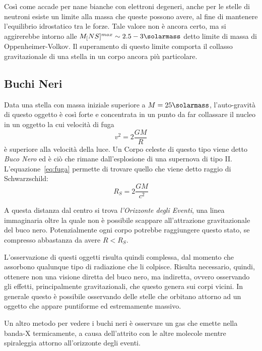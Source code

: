 Così come accade per nane bianche con elettroni degeneri, anche per le stelle di neutroni esiste un limite alla massa che queste possono avere, al fine di mantenere l'equilibrio idrostatico tra le forze. Tale valore non è ancora certo, ma si aggirerebbe intorno alle $M_[NS]^{max} \sim 2.5 - 3 \si{\solarmass}$ detto limite di massa di Oppenheimer-Volkov. Il superamento di questo limite comporta il collasso gravitazionale di una stella in un corpo ancora più particolare.\subsection{Buchi Neri}\label{black-holes}

Data una stella con massa iniziale superiore a $M = 25\si{\solarmass}$, l'auto-gravità di questo oggetto è così forte e concentrata in un punto da far collassare il nucleo in un oggetto la cui velocità di fuga
\begin{equation}\label{eq:fuga}
    v^2 = 2 \frac{GM}{R}
\end{equation}
è superiore alla velocità della luce. Un Corpo celeste di questo tipo viene detto \textit{Buco Nero} ed è ciò che rimane dall'esplosione di una supernova di tipo II. L'equazione~\ref{eq:fuga} permette di trovare quello che viene detto raggio di Schwarzschild:
\begin{equation}\label{eq:schwarzschild}
    R_S = 2 \frac{GM}{c^2}
\end{equation}

A questa distanza dal centro si trova \textit{l'Orizzonte degli Eventi}, una linea immaginaria oltre la quale non è possibile scappare all'attrazione gravitazionale del buco nero. Potenzialmente ogni corpo potrebbe raggiungere questo stato, se compresso abbastanza da avere $R<R_S$.

L'osservazione di questi oggetti risulta quindi complessa, dal momento che assorbono qualunque tipo di radiazione che li colpisce. Risulta necessario, quindi, ottenere non una visione diretta del buco nero, ma indiretta, ovvero osservando gli effetti, principalmente gravitazionali, che questo genera sui corpi vicini. In generale questo è possibile osservando delle stelle che orbitano attorno ad un oggetto che appare puntiforme ed estremamente massivo.

Un altro metodo per vedere i buchi neri è osservare un gas che emette nella banda-X termicamente, a causa dell'attrito con le altre molecole mentre spiraleggia attorno all'orizzonte degli eventi.

